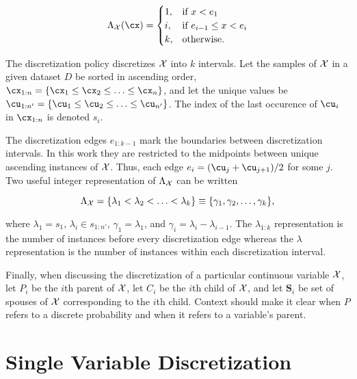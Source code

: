 \begin{equation}
  \Lambda_{\cX}(\cx) = \begin{cases}
    1, & \text{if $x<e_1$}\\
    i, & \text{if $e_{i-1} \leq x < e_i$}\\
    k, & \text{otherwise.}
  \end{cases}
\end{equation}

\noindent
The discretization policy discretizes $\mathcal{X}$ into $k$ intervals.
Let the samples of $\mathcal{X}$ in a given dataset $D$ be sorted in ascending order, ${\cx_{1:n} = \curly{\cx_1 \leq \cx_2 \leq \ldots \leq \cx_n}}$, and let the unique values be ${\cu_{1:n'} = \curly{\cu_1 \leq \cu_2 \leq \ldots \leq \cu_{n'}}}$.
The index of the last occurence of $\cu_i$ in $\cx_{1:n}$ is denoted $s_i$.

The discretization edges $e_{1:k-1}$ mark the boundaries between discretization intervals.
In this work they are restricted to the midpoints between unique ascending instances of $\mathcal{X}$.
Thus, each edge $e_i = \paren{\cu_{j} + \cu_{{j+1}}}/2$ for some $j$.
Two useful integer representation of $\Lambda_{\mathcal{X}}$ can be written

\begin{equation}
\label{eq:disc_def}
  \Lambda_{\cX} = \curly{\lambda_1 < \lambda_2  < \ldots < \lambda_k} \equiv \curly{\gamma_1 , \gamma_2  , \ldots , \gamma_k}\text{,}
\end{equation}

\noindent
where $\lambda_1 = s_1$, $\lambda_i \in s_{1:n'}$, $\gamma_1 = \lambda_1$, and $\gamma_i = \lambda_i - \lambda_{i-1}$.
The $\lambda_{1:k}$ representation is the number of instances before every discretization edge whereas the $\lambda$ representation is the number of instances within each discretization interval.

Finally, when discussing the discretization of a particular continuous variable $\mathcal{X}$, let $P_i$ be the $i$th parent of $\mathcal{X}$, let $C_i$ be the $i$th child of $\mathcal{X}$, and let $\bm{S}_i$ be set of spouses of $\mathcal{X}$ corresponding to the $i$th child.
Context should make it clear when $P$ refers to a discrete probability and when it refers to a variable's parent.


\section{Single Variable Discretization}
\label{sec:single_var}

